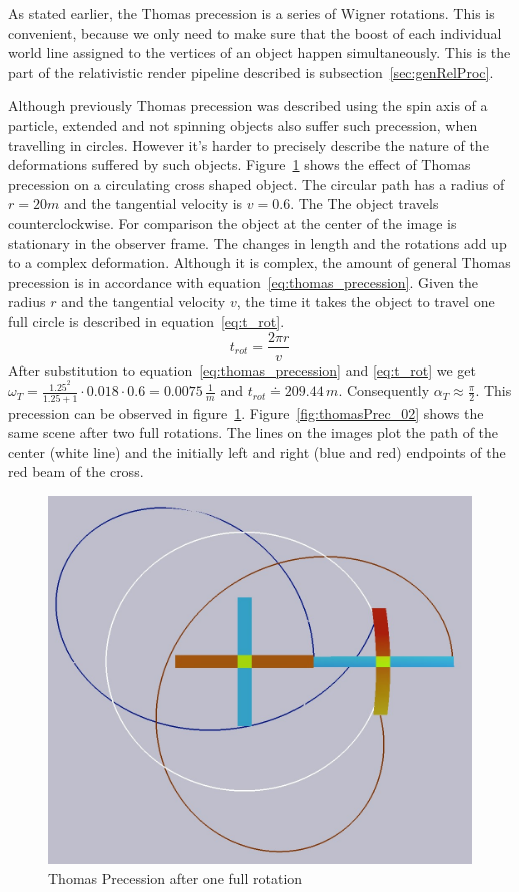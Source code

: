 \documentclass{egpubl}
\begin{document}
As stated earlier, the Thomas precession is a series of Wigner rotations. This is convenient, because we only need to make sure that the boost of each individual world line assigned to the vertices of an object happen simultaneously. This is the part of the relativistic render pipeline described is subsection~\ref{sec:genRelProc}.

Although previously Thomas precession was described using the spin axis of a particle, extended and not spinning objects also suffer such precession, when travelling in circles. However it's harder to precisely describe the nature of the deformations suffered by such objects. Figure~\ref{fig:thomasPrec_01} shows the effect of Thomas precession on a circulating cross shaped object. The circular path has a radius of $r=20m$ and the tangential velocity is $v=0.6$. The The object travels counterclockwise. For comparison the object at the center of the image is stationary in the observer frame. The changes in length and the rotations add up to a complex deformation. Although it is complex, the amount of general Thomas precession is in accordance with equation~\ref{eq:thomas_precession}. Given the radius $r$ and the tangential velocity $v$, the time it takes the object to travel one full circle is described in equation~\ref{eq:t_rot}.
\begin{equation}
t_{rot}=\frac{2\pi{}r}{v}
\label{eq:t_rot}
\end{equation}
After substitution to equation~\ref{eq:thomas_precession} and \ref{eq:t_rot} we get $\omega_T=\frac{1.25^2}{1.25+1}\cdot{}0.018\cdot{}0.6=0.0075\,\frac{1}{m}$ and $t_{rot} \doteq 209.44\,{}m$. Consequently $\alpha{}_T \approx \frac{\pi}{2}$. This precession can be observed in figure~\ref{fig:thomasPrec_01}. Figure~\ref{fig:thomasPrec_02} shows the same scene after two full rotations. The lines on the images plot the path of the center (white line) and the initially left and right (blue and red) endpoints of the red beam of the cross.
\begin{figure}[htb]
\centering
\includegraphics[width=0.8\linewidth]{figures/v06_r20_1rot_path.jpg}
\caption{Thomas Precession after one full rotation}
	\label{fig:thomasPrec_01}
\end{figure}
\end{document}
